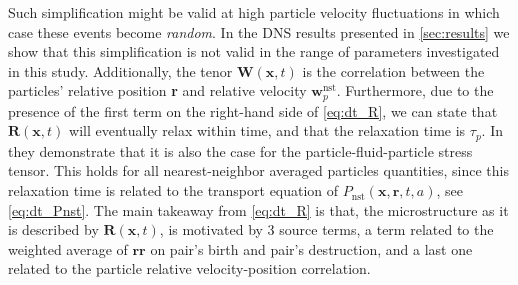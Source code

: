 Such simplification might be valid at high particle velocity fluctuations in which case these events become \textit{random}.
In the DNS results presented in \ref{sec:results} we show that this simplification is not valid in the range of parameters investigated in this study.
Additionally, the tenor $\textbf{W}(\textbf{x},t)$ is the correlation between the particles' relative position \textbf{r} and relative velocity $\textbf{w}_p^\text{nst}$.
Furthermore, due to the presence of the first term on the right-hand side of \ref{eq:dt_R}, we can state that $\textbf{R}(\textbf{x},t)$ will eventually relax within time, and that the relaxation time is $\tau_p$. 
In \citet{zhang2023evolution} they demonstrate that it is also the case for the particle-fluid-particle stress tensor.
This holds for all nearest-neighbor averaged particles quantities, since this relaxation time is related to the transport equation of $P_\text{nst}(\textbf{x},\textbf{r},t,a)$, see \ref{eq:dt_Pnst}.
The main takeaway from \ref{eq:dt_R} is that, the microstructure as it is described by $\textbf{R}(\textbf{x},t)$, is motivated by 3 source terms, a term related to the weighted average of $\textbf{rr}$ on pair's birth and pair's destruction, and a last one related to the particle relative velocity-position correlation. 


